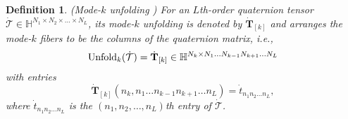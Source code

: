 \documentclass[journal]{IEEEtran}
\newtheorem{definition}{Definition}
\begin{document}
\begin{definition}(Mode-$k$ unfolding \cite{DBLP:journals/pr/MiaoKL20}) For an $L$th-order quaternion tensor $\dot{\mathcal{T}}\in\mathbb{H}^{N_{1}\times N_{2} \times\ldots \times N_{L}}$, its mode-$k$ unfolding is denoted by $\dot{\mathbf{T}}_{[k]}$ and arranges the mode-$k$ fibers to be the columns of the quaternion matrix, i.e.,
	\begin{equation*}
	{\rm{Unfold}}_{k}(\dot{\mathcal{T}})=\dot{\mathbf{T}}_{[k]}\in\mathbb{H}^{N_{k}\times N_{1}\ldots N_{k-1}N_{k+1}\ldots N_{L}} 
	\end{equation*}
with entries
	\begin{equation*}
	\dot{\mathbf{T}}_{[k]}(n_{k}, n_{1}\ldots n_{k-1}n_{k+1}\ldots n_{L})=\dot{t}_{n_{1}n_{2}\ldots n_{L}},
	\end{equation*}
	where $\dot{t}_{n_{1}n_{2}\ldots n_{L}}$ is the $(n_{1},n_{2},\ldots,n_{L})$th entry of $\dot{\mathcal{T}}$.
\end{definition}
\end{document}
